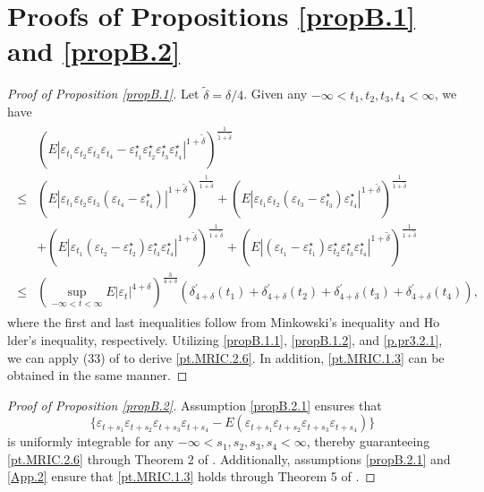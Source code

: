 \documentclass[ejsv2]{imsart}
\theoremstyle{plain}
\theoremstyle{definition}
\theoremstyle{remark}
\begin{document}
\section{{Proofs of Propositions \ref{propB.1} and \ref{propB.2}}}\label{Ex3-S}
{
\begin{proof}[Proof of Proposition \ref{propB.1}]
Let $\tilde{\delta}=\delta/4$. Given any $-\infty<t_1,t_2,t_3,t_4<\infty$, we have
\begin{align}\label{p.pr3.2.1}
\begin{split}
     & (E|\varepsilon_{t_1}\varepsilon_{t_2}\varepsilon_{t_3}\varepsilon_{t_4}-\varepsilon^\star_{t_1}\varepsilon^\star_{t_2}\varepsilon^\star_{t_3}\varepsilon^\star_{t_4}|^{1+\tilde{\delta}})^{\frac{1}{1+\tilde{\delta}}} \\
  \leq & (E|\varepsilon_{t_1}\varepsilon_{t_2}\varepsilon_{t_3}(\varepsilon_{t_4}-\varepsilon^\star_{t_4})|^{1+\tilde{\delta}})^{\frac{1}{1+\tilde{\delta}}}+
  (E|\varepsilon_{t_1}\varepsilon_{t_2}(\varepsilon_{t_3}-\varepsilon^\star_{t_3})\varepsilon^\star_{t_4}|^{1+\tilde{\delta}})^{\frac{1}{1+\tilde{\delta}}}\\
  &+(E|\varepsilon_{t_1}(\varepsilon_{t_2}-\varepsilon^\star_{t_2})\varepsilon^\star_{t_3}\varepsilon^\star_{t_4}|^{1+\tilde{\delta}})^{\frac{1}{1+\tilde{\delta}}}+
  (E|(\varepsilon_{t_1}-\varepsilon^\star_{t_1})\varepsilon^\star_{t_2}\varepsilon^\star_{t_3}\varepsilon^\star_{t_4}|^{1+\tilde{\delta}})^{\frac{1}{1+\tilde{\delta}}}\\
  \leq& (\sup\limits_{-\infty<t<\infty}E|\varepsilon_t|^{4+\delta})^{\frac{3}{4+\delta}}(\delta^\prime_{4+\delta}(t_1)+\delta^\prime_{4+\delta}(t_2)+\delta^\prime_{4+\delta}(t_3)+\delta^\prime_{4+\delta}(t_4)),
\end{split}
\end{align}
where the first and last inequalities follow from Minkowski's inequality and H$\ddot{\mathrm{o}}$lder's inequality, respectively. Utilizing \eqref{propB.1.1}, \eqref{propB.1.2}, and \eqref{p.pr3.2.1}, we can apply (33) of \cite{Xiao2011} to derive \eqref{pt.MRIC.2.6}. In addition, \eqref{pt.MRIC.1.3} can be obtained in the same manner.
\end{proof}

\begin{proof}[Proof of Proposition \ref{propB.2}]
Assumption \eqref{propB.2.1} ensures that $$\{\varepsilon_{t+s_1}\varepsilon_{t+s_2}\varepsilon_{t+s_3}\varepsilon_{t+s_4}-E(\varepsilon_{t+s_1}\varepsilon_{t+s_2}\varepsilon_{t+s_3}\varepsilon_{t+s_4})\}$$ is uniformly integrable for any $-\infty<s_1,s_2,s_3,s_4<\infty$, thereby guaranteeing \eqref{pt.MRIC.2.6} through Theorem 2 of \cite{Andrews1988M}. %
Additionally, assumptions \eqref{propB.2.1} and \eqref{App.2} ensure that \eqref{pt.MRIC.1.3} holds  through Theorem 5 of \cite{Kim1994M}.%
\end{proof}}
\end{document}
